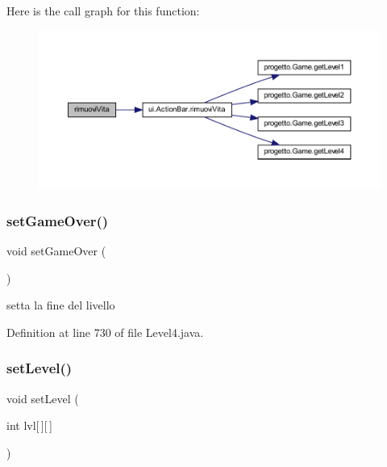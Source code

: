 Here is the call graph for this function\+:\nopagebreak
\begin{figure}[H]
\begin{center}
\leavevmode
\includegraphics[width=350pt]{classscenes_1_1_level4_a484775c889ccd8602b66ad795b141534_cgraph}
\end{center}
\end{figure}
\mbox{\label{classscenes_1_1_level4_a49e1d0816e9e0cabfb855147f399f5b5}} 
\subsubsection{\texorpdfstring{set\+Game\+Over()}{setGameOver()}}
{\footnotesize\ttfamily void set\+Game\+Over (\begin{DoxyParamCaption}{ }\end{DoxyParamCaption})}



setta la fine del livello 



Definition at line 730 of file Level4.\+java.

\mbox{\label{classscenes_1_1_level4_afdd7363804bf6696ce4a46d6448844ed}} 
\subsubsection{\texorpdfstring{set\+Level()}{setLevel()}}
{\footnotesize\ttfamily void set\+Level (\begin{DoxyParamCaption}\item[{int}]{lvl\mbox{[}$\,$\mbox{]}\mbox{[}$\,$\mbox{]} }\end{DoxyParamCaption})}



